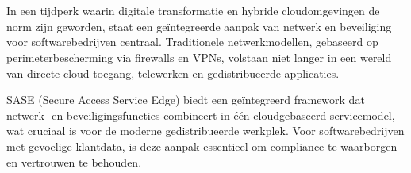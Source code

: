 
\chapter{}%
\label{ch:inleiding}



In een tijdperk waarin digitale transformatie en hybride cloudomgevingen de norm zijn geworden, staat een geïntegreerde aanpak van netwerk en beveiliging voor softwarebedrijven centraal. 
Traditionele netwerkmodellen, gebaseerd op perimeterbescherming via firewalls en VPNs, volstaan niet langer in een wereld van directe cloud-toegang, telewerken en gedistribueerde applicaties. 

\vspace{2ex}

SASE (Secure Access Service Edge) biedt een geïntegreerd framework dat netwerk- en beveiligingsfuncties combineert in één cloudgebaseerd servicemodel, wat cruciaal is voor de moderne gedistribueerde werkplek. Voor softwarebedrijven met gevoelige klantdata, is deze aanpak essentieel om compliance te waarborgen en vertrouwen te behouden.

\vspace{2ex}

